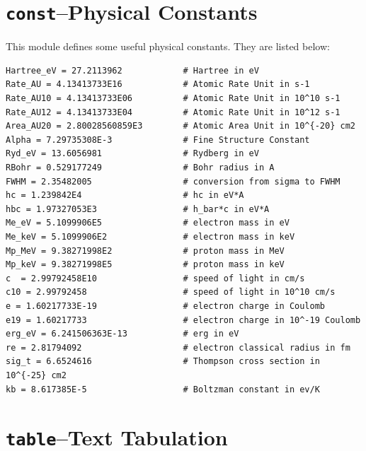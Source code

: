 \documentclass[twoside,letterpaper]{refrep}
\newcommand{\mod}[1]{\texttt{#1}}
\begin{document}
\section{\mod{const}--Physical Constants}
\label{sec:const}
This module defines some useful physical constants. They are listed below:
\begin{verbatim}
Hartree_eV = 27.2113962            # Hartree in eV   
Rate_AU = 4.13413733E16            # Atomic Rate Unit in s-1
Rate_AU10 = 4.13413733E06          # Atomic Rate Unit in 10^10 s-1
Rate_AU12 = 4.13413733E04          # Atomic Rate Unit in 10^12 s-1
Area_AU20 = 2.80028560859E3        # Atomic Area Unit in 10^{-20} cm2
Alpha = 7.29735308E-3              # Fine Structure Constant
Ryd_eV = 13.6056981                # Rydberg in eV
RBohr = 0.529177249                # Bohr radius in A
FWHM = 2.35482005                  # conversion from sigma to FWHM
hc = 1.239842E4                    # hc in eV*A
hbc = 1.97327053E3                 # h_bar*c in eV*A
Me_eV = 5.1099906E5                # electron mass in eV
Me_keV = 5.1099906E2               # electron mass in keV
Mp_MeV = 9.38271998E2              # proton mass in MeV
Mp_keV = 9.38271998E5              # proton mass in keV
c  = 2.99792458E10                 # speed of light in cm/s
c10 = 2.99792458                   # speed of light in 10^10 cm/s
e = 1.60217733E-19                 # electron charge in Coulomb
e19 = 1.60217733                   # electron charge in 10^-19 Coulomb
erg_eV = 6.241506363E-13           # erg in eV
re = 2.81794092                    # electron classical radius in fm
sig_t = 6.6524616                  # Thompson cross section in 10^{-25} cm2
kb = 8.617385E-5                   # Boltzman constant in ev/K
\end{verbatim}

\section{\mod{table}--Text Tabulation}
\label{sec:table}
\end{document}
